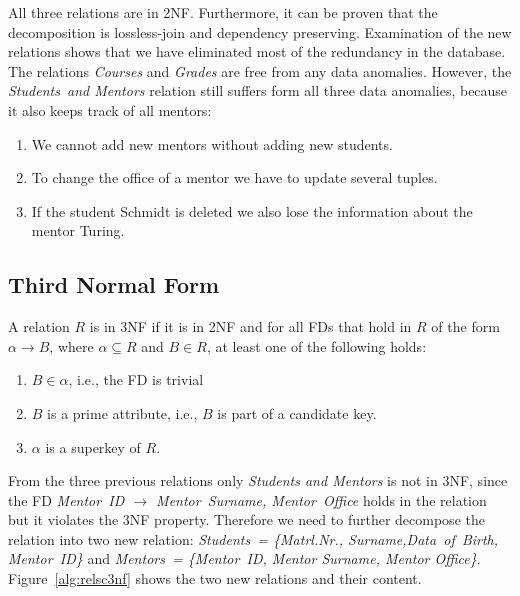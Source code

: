 All three relations are in 2NF. Furthermore, it can be proven that the
decomposition is lossless-join and dependency preserving. 
Examination of the new relations shows that we have eliminated most of the redundancy 
in the database. The relations \textit{Courses} and \textit{Grades} are free
from any data anomalies. However, the \textit{Students~and Mentors} relation still suffers form all three
data anomalies, because it also keeps track of all mentors:
\begin{enumerate}
  \item We cannot add new mentors without adding new students.
  \item To change the office of a mentor we have to update several tuples.
  \item If the student Schmidt is deleted we also lose the information about the mentor Turing.
\end{enumerate}
 
\subsection{Third Normal Form}
A relation $R$ is in 3NF if it is in 2NF and for all FDs that hold in $R$
of the form $\alpha \rightarrow B$, where $\alpha \subseteq  R$ and $B \in R$, 
at least one of the following holds: 
\begin{enumerate}
  \item $B \in \alpha$, i.e., the FD is trivial
  \item $B$ is a prime attribute, i.e., $B$ is part of a candidate key.
  \item $\alpha$ is a superkey of $R$.
\end{enumerate}

From the three previous relations only \textit{Students and Mentors} is not in 3NF, since 
the FD \textit{Mentor~ID $\rightarrow$ Mentor~Surname, Mentor~Office} holds in the relation but 
it violates the 3NF property. Therefore we need to further decompose the relation into two
new relation: \textit{Students~= \{Matrl.Nr., Surname,Data~of~Birth, Mentor~ID\}} and
\textit{Mentors~= \{Mentor~ID, Mentor Surname, Mentor Office\}}.
Figure~\ref{alg:relsc3nf} shows the two new relations and their content.

